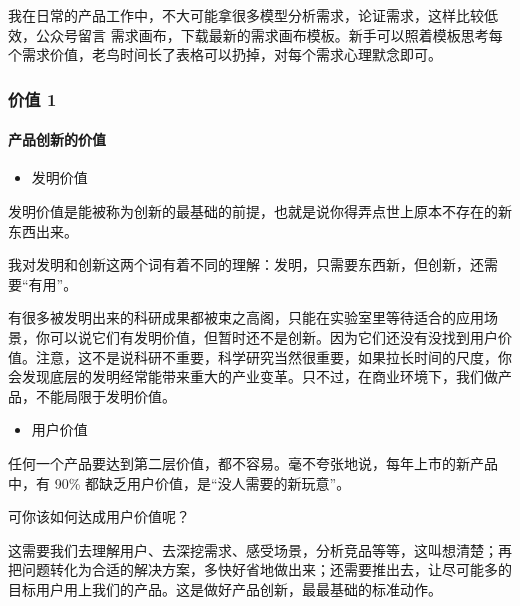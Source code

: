\documentclass[letterpaper,10pt,english]{sphinxmanual}
\begin{document}
我在日常的产品工作中，不大可能拿很多模型分析需求，论证需求，这样比较低效，公众号留言
需求画布，下载最新的需求画布模板。新手可以照着模板思考每个需求价值，老鸟时间长了表格可以扔掉，对每个需求心理默念即可。


\subsubsection{价值 1\sphinxfootnotemark[824]}
\label{\detokenize{chapter_project/valuable:id1}}\label{\detokenize{chapter_project/valuable::doc}}%
\begin{footnotetext}[824]\sphinxAtStartFootnote
{}
%
\end{footnotetext}\ignorespaces 

\paragraph{产品创新的价值}
\label{\detokenize{chapter_project/valuable:id2}}\begin{itemize}
\item {} 
发明价值

\end{itemize}

发明价值是能被称为创新的最基础的前提，也就是说你得弄点世上原本不存在的新东西出来。

我对发明和创新这两个词有着不同的理解：发明，只需要东西新，但创新，还需要“有用”。

有很多被发明出来的科研成果都被束之高阁，只能在实验室里等待适合的应用场景，你可以说它们有发明价值，但暂时还不是创新。因为它们还没有没找到用户价值。注意，这不是说科研不重要，科学研究当然很重要，如果拉长时间的尺度，你会发现底层的发明经常能带来重大的产业变革。只不过，在商业环境下，我们做产品，不能局限于发明价值。
\begin{itemize}
\item {} 
用户价值

\end{itemize}

任何一个产品要达到第二层价值，都不容易。毫不夸张地说，每年上市的新产品中，有
90\% 都缺乏用户价值，是“没人需要的新玩意”。

可你该如何达成用户价值呢？

这需要我们去理解用户、去深挖需求、感受场景，分析竞品等等，这叫想清楚；再把问题转化为合适的解决方案，多快好省地做出来；还需要推出去，让尽可能多的目标用户用上我们的产品。这是做好产品创新，最最基础的标准动作。
\end{document}
